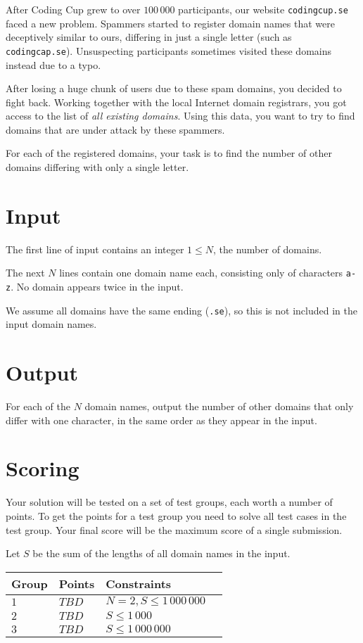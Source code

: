 After Coding Cup grew to over $100\,000$ participants, our website \texttt{codingcup.se} faced a new problem.
Spammers started to register domain names that were deceptively similar to ours, differing in just a single letter (such as \texttt{codingcap.se}).
Unsuspecting participants sometimes visited these domains instead due to a typo.

After losing a huge chunk of users due to these spam domains, you decided to fight back.
Working together with the local Internet domain registrars, you got access to the list of \emph{all existing domains}.
Using this data, you want to try to find domains that are under attack by these spammers.

For each of the registered domains, your task is to find the number of other domains differing with only a single letter.

\section*{Input}
The first line of input contains an integer $1 \le N$, the number of domains.

The next $N$ lines contain one domain name each, consisting only of characters \texttt{a-z}.
No domain appears twice in the input.

We assume all domains have the same ending (\texttt{.se}), so this is not included in the input domain names.

\section*{Output}
For each of the $N$ domain names, output the number of other domains that only differ with one character, in the same order as they appear in the input.

\section*{Scoring}
Your solution will be tested on a set of test groups, each worth a number of points.
To get the points for a test group you need to solve all test cases in the test group.
Your final score will be the maximum score of a single submission.

Let $S$ be the sum of the lengths of all domain names in the input.

\noindent
\begin{tabular}{| l | l | l | l |}
\hline
Group & Points & Constraints \\ \hline
$1$    & $TBD$         & $N = 2, S \le 1\,000\,000$ \\ \hline
$2$    & $TBD$         & $S \le 1\,000$ \\ \hline
$3$    & $TBD$         & $S \le 1\,000\,000$ \\ \hline
\end{tabular}
